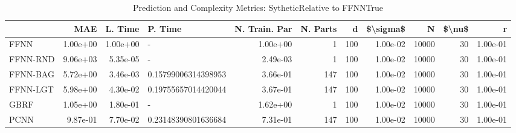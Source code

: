 \begin{table}
\centering
\caption{Prediction and Complexity Metrics: SytheticRelative to FFNNTrue}
\label{tab__Sythetic__Fix_Neurons_QTrue}
\begin{tabular}{lrrlrrrrrrr}
\toprule
{} &      MAE &  L. Time &              P. Time &  N. Train. Par &  N. Parts &    d &  \$\textbackslash sigma\$ &      N &  \$\textbackslash nu\$ &        r \\
\midrule
FFNN     & 1.00e+00 & 1.00e+00 &                    - &       1.00e+00 &         1 &  100 &  1.00e-02 &  10000 &     30 & 1.00e-01 \\
FFNN-RND & 9.06e+03 & 5.35e-05 &                    - &       2.49e-03 &         1 &  100 &  1.00e-02 &  10000 &     30 & 1.00e-01 \\
FFNN-BAG & 5.72e+00 & 3.46e-03 &  0.15799006314398953 &       3.66e-01 &       147 &  100 &  1.00e-02 &  10000 &     30 & 1.00e-01 \\
FFNN-LGT & 5.98e+00 & 4.30e-02 &  0.19755657014420044 &       3.67e-01 &       147 &  100 &  1.00e-02 &  10000 &     30 & 1.00e-01 \\
GBRF     & 1.05e+00 & 1.80e-01 &                    - &       1.62e+00 &         1 &  100 &  1.00e-02 &  10000 &     30 & 1.00e-01 \\
PCNN     & 9.87e-01 & 7.70e-02 &  0.23148390801636684 &       7.31e-01 &       147 &  100 &  1.00e-02 &  10000 &     30 & 1.00e-01 \\
\bottomrule
\end{tabular}
\end{table}
